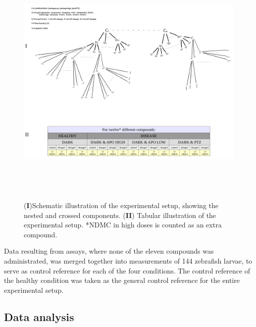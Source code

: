 \documentclass[a4paper,12pt]{article}
\begin{document}
\begin{figure}[h]
\begin{center}
\includegraphics[width=17cm,height=12.5cm]{expdesignComb.png}
\caption{(\textbf{I})Schematic illustration of the experimental setup, showing the nested and crossed components. (\textbf{II}) Tabular illustration of the experimental setup. *NDMC in high doses is counted as an extra compound.}
\end{center}
\end{figure}

Data resulting from assays, where none of the eleven compounds was administrated, was merged together into measurements of 144 zebrafish larvae, to serve as control reference for each of the four conditions. The control reference of the healthy condition was taken as the general control reference for the entire experimental setup. 
\subsection{Data analysis}
\end{document}
